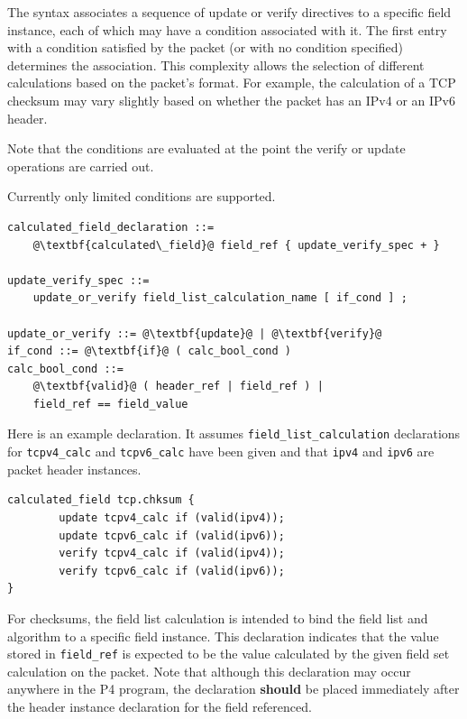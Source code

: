 \documentclass[12pt]{article}
\begin{document}
The syntax associates a sequence of update or verify directives to a
specific field instance, each of which may have a condition associated
with it. The first entry with a condition satisfied by the packet (or
with no condition specified) determines the association. This
complexity allows the selection of different calculations based on the
packet's format. For example, the calculation of a TCP checksum may
vary slightly based on whether the packet has an IPv4 or an IPv6
header.

Note that the conditions are evaluated at the point the verify or
update operations are carried out.

Currently only limited conditions are supported.

\begin{lstlisting}[frame=single,backgroundcolor=\color{bnfgreen},escapechar=\@]
calculated_field_declaration ::=
    @\textbf{calculated\_field}@ field_ref { update_verify_spec + }

update_verify_spec ::=
    update_or_verify field_list_calculation_name [ if_cond ] ;

update_or_verify ::= @\textbf{update}@ | @\textbf{verify}@
if_cond ::= @\textbf{if}@ ( calc_bool_cond )
calc_bool_cond ::=
    @\textbf{valid}@ ( header_ref | field_ref ) |
    field_ref == field_value
\end{lstlisting}

Here is an example declaration. It assumes \texttt{field_list_calculation} declarations
for \texttt{tcpv4_calc} and \texttt{tcpv6_calc} have been given and that \texttt{ipv4} and \texttt{ipv6} are
packet header instances.

\begin{lstlisting}[keywords={},frame=single,escapechar=\@]
calculated_field tcp.chksum {
        update tcpv4_calc if (valid(ipv4));
        update tcpv6_calc if (valid(ipv6));
        verify tcpv4_calc if (valid(ipv4));
        verify tcpv6_calc if (valid(ipv6));
}
\end{lstlisting}

For checksums, the field list calculation is intended to bind the field list
and algorithm to a specific field instance. This declaration indicates that
the value stored in \texttt{field_ref} is expected to be the value calculated by the
given field set calculation on the packet. Note that although this declaration
may occur anywhere in the P4 program, the declaration \textbf{should} be placed immediately
after the header instance declaration for the field referenced.
\end{document}
